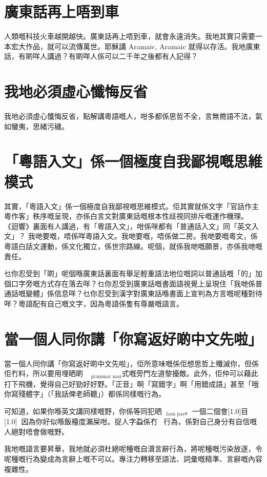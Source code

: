 \section{廣東話再上唔到車}
人類嘅科技火車越開越快。廣東話再上唔到車，就會永遠消失。我地其實只需要一本宏大作品，就可以流傳萬世。耶穌講 Aramaic, Aramaic 就得以存活。我地廣東話，有啲咩人講過？有啲咩人係可以二千年之後都有人記得？



\section{我地必須虛心懺悔反省}
我地必須虛心懺悔反省，點解講粵語嘅人，咁多都係思哲不全，言無黹語不法，氣如蠻夷，思緒污穢。

\section{「粵語入文」係一個極度自我鄙視嘅思維模式}
其實，「粵語入文」係一個極度自我鄙視嘅思維模式。佢其實就係文字「官話作主粵作客」秩序嘅呈現，亦係白言文對廣東話嘅根本性歧視同排斥嘅運作機理。
《迴響》裏面有人講過，有「粵語入文」，咁係咪都有「普通話入文」同「英文入文」？
我哋要嘅，唔係咩粵語入文。我哋要嘅，唔係做二房。我哋要嘅粵文，係粵語白話文運動，係文化獨立，係世宗路線。呢個，就係我哋嘅願景，亦係我哋嘅責任。

乜你忍受到「啲」呢個喺廣東話裏面有舉足輕重語法地位嘅詞以普通話嘅「的」加個口字旁嘅方式存在落去咩？乜你忍受到廣東話嘅書面語視覺上呈現住「我哋係普通話嘅變體」係信息咩？乜你忍受到漢字對廣東話喺書面上宣判為方言嘅呢種對待咩？粵語配有自己嘅文字，因為粵語係隻有尊嚴嘅語言。




\section{當一個人同你講「你寫返好啲中文先啦」}

當一個人同你講「你寫返好啲中文先啦」，佢所意味嘅係佢想思哲上殲滅你，但係佢冇料，所以要用埋晒啲󰲎󱂧$_{\text{grammar nazi}}$式嘅旁門左道黎擾敵。此外，佢仲可以藉此打下飛機，覺得自己好勁好好野。「正音」啊「寫錯字」啊「用錯成語」甚至「哦你寫殘體字」（「我話俾老師聽」）都係同樣嘅行為。

可知道，如果你喺英文講同樣嘅野，你係等同犯晒󰠲󰎖$_{\text{faux pas}}$。一個二個會\scalebox{0.5}[1.0]{目}\scalebox{0.5}[1.0]{}，因為你好似喺飯檯度瀨屎咁。捉人字蝨係冇󱐡󱝚行為，係對自己身分有自信嘅人絕對唔會做嘅野。

我地嘅語言要昇華，我地就必須杜絕呢種嘅自瀆言辭行為，將呢種嘅污染放逐，令呢種嘅行為變成為言辭上嘅不可以。專注力轉移至語法、詞彙嘅精準、言辭嘅內容複雜性。


